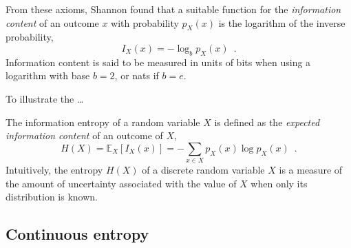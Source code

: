 From these axioms, Shannon found that a suitable function for the \emph{information content} of an outcome $x$ with probability $p_X(x)$ is the logarithm of the inverse probability,
%
\begin{equation}
    I_X(x) = -\log_b p_X(x) \enspace .
\end{equation}
%
Information content is said to be measured in units of bits when using a logarithm with base $b=2$, or nats if $b=e$. 

To illustrate the \dots {}

The information entropy of a random variable $X$ is defined as the \emph{expected information content} of an outcome of $X$,
%
\begin{equation}
    H(X) = \mathbb{E}_X\left[I_X(x)\right] = - \sum_{x\in X} p_X(x) \log p_X(x) \enspace .
\end{equation}
%
Intuitively, the entropy $H(X)$ of a discrete random variable $X$ is a measure of the amount of uncertainty associated with the value of $X$ when only its distribution is known. 


\subsection{Continuous entropy}










